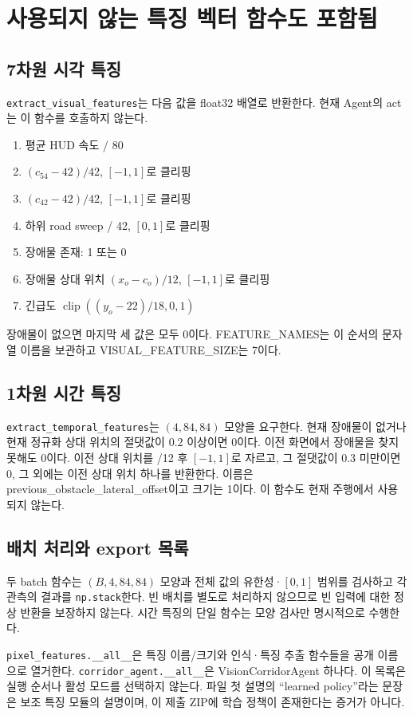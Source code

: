 \documentclass[11pt,a4paper]{article}
\newcommand{\code}[1]{{\small\nolinkurl{#1}}}
\newcommand{\clip}{\operatorname{clip}}
\begin{document}
\section{사용되지 않는 특징 벡터 함수도 포함됨}
\subsection{7차원 시각 특징}
\code{extract_visual_features}는 다음 값을 float32 배열로 반환한다. 현재 Agent의 act는 이 함수를 호출하지 않는다.
\begin{enumerate}
\item 평균 HUD 속도 / 80
\item $(c_{54}-42)/42$, $[-1,1]$로 클리핑
\item $(c_{42}-42)/42$, $[-1,1]$로 클리핑
\item 하위 road sweep / 42, $[0,1]$로 클리핑
\item 장애물 존재: 1 또는 0
\item 장애물 상대 위치 $(x_o-c_o)/12$, $[-1,1]$로 클리핑
\item 긴급도 $\clip((y_o-22)/18,0,1)$
\end{enumerate}
장애물이 없으면 마지막 세 값은 모두 0이다. FEATURE\_NAMES는 이 순서의 문자열 이름을 보관하고 VISUAL\_FEATURE\_SIZE는 7이다.

\subsection{1차원 시간 특징}
\code{extract_temporal_features}는 $(4,84,84)$ 모양을 요구한다. 현재 장애물이 없거나 현재 정규화 상대 위치의 절댓값이 0.2 이상이면 0이다. 이전 화면에서 장애물을 찾지 못해도 0이다. 이전 상대 위치를 /12 후 $[-1,1]$로 자르고, 그 절댓값이 0.3 미만이면 0, 그 외에는 이전 상대 위치 하나를 반환한다. 이름은 previous\_obstacle\_lateral\_offset이고 크기는 1이다. 이 함수도 현재 주행에서 사용되지 않는다.

\subsection{배치 처리와 export 목록}
두 batch 함수는 $(B,4,84,84)$ 모양과 전체 값의 유한성·$[0,1]$ 범위를 검사하고 각 관측의 결과를 \code{np.stack}한다. 빈 배치를 별도로 처리하지 않으므로 빈 입력에 대한 정상 반환을 보장하지 않는다. 시간 특징의 단일 함수는 모양 검사만 명시적으로 수행한다.

\code{pixel_features.__all__}은 특징 이름/크기와 인식·특징 추출 함수들을 공개 이름으로 열거한다. \code{corridor_agent.__all__}은 VisionCorridorAgent 하나다. 이 목록은 실행 순서나 활성 모드를 선택하지 않는다. 파일 첫 설명의 ``learned policy''라는 문장은 보조 특징 모듈의 설명이며, 이 제출 ZIP에 학습 정책이 존재한다는 증거가 아니다.
\end{document}
